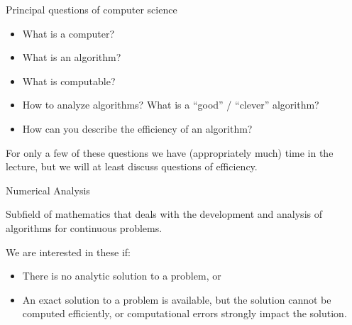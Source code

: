 \documentclass[11pt,compress,t,notes=noshow, xcolor=table]{beamer}
\begin{document}












\begin{vbframe}{Principal questions of computer science}
\begin{itemize}
  \item What is a computer?
  \item What is an algorithm?
  \item What is computable?
  \item How to analyze algorithms? What is
    a \enquote{good} / \enquote{clever} algorithm?
  \item How can you describe the efficiency of an algorithm?
\end{itemize}

\lz

For only a few of these questions we have (appropriately much) time in the lecture, but we will at least discuss questions of efficiency.

\end{vbframe}

\begin{vbframe}{Numerical Analysis}

Subfield of mathematics that deals with the development and analysis of algorithms for continuous problems.

\lz

We are interested in these if:
\begin{itemize}
\item There is no analytic solution to a problem, or
\item An exact solution to a problem is available, but the solution cannot be computed efficiently,
  or computational errors strongly impact the solution.
\end{itemize}
\end{vbframe}
\end{document}

